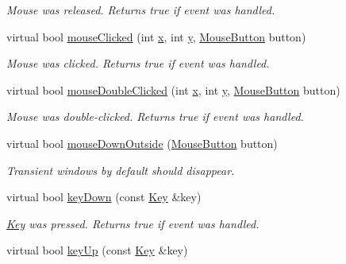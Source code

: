\begin{DoxyCompactItemize}
\begin{DoxyCompactList}\small\item\em Mouse was released. Returns true if event was handled. \end{DoxyCompactList}\item 
virtual bool \hyperlink{classGUI_1_1Window_a9519fe8a8f08b5b70524d2230d209107}{mouse\-Clicked} (int \hyperlink{classGUI_1_1Window_a6ca6a80ca00c9e1d8ceea8d3d99a657d}{x}, int \hyperlink{classGUI_1_1Window_a0ee8e923aff2c3661fc2e17656d37adf}{y}, \hyperlink{namespaceGUI_ad06082a7b02aa73697f39eb8e0856de9}{Mouse\-Button} button)
\begin{DoxyCompactList}\small\item\em Mouse was clicked. Returns true if event was handled. \end{DoxyCompactList}\item 
\hypertarget{classGUI_1_1Window_a42d1c5fd68792cc1bfe551c9fcf76248}{virtual bool \hyperlink{classGUI_1_1Window_a42d1c5fd68792cc1bfe551c9fcf76248}{mouse\-Double\-Clicked} (int \hyperlink{classGUI_1_1Window_a6ca6a80ca00c9e1d8ceea8d3d99a657d}{x}, int \hyperlink{classGUI_1_1Window_a0ee8e923aff2c3661fc2e17656d37adf}{y}, \hyperlink{namespaceGUI_ad06082a7b02aa73697f39eb8e0856de9}{Mouse\-Button} button)}\label{classGUI_1_1Window_a42d1c5fd68792cc1bfe551c9fcf76248}

\begin{DoxyCompactList}\small\item\em Mouse was double-\/clicked. Returns true if event was handled. \end{DoxyCompactList}\item 
virtual bool \hyperlink{classGUI_1_1Window_a7f661001795d601ecf3f4af66ac19e0f}{mouse\-Down\-Outside} (\hyperlink{namespaceGUI_ad06082a7b02aa73697f39eb8e0856de9}{Mouse\-Button} button)
\begin{DoxyCompactList}\small\item\em Transient windows by default should disappear. \end{DoxyCompactList}\item 
\hypertarget{classGUI_1_1Window_a9d058fb85cb7d5a616e292cc02e01959}{virtual bool \hyperlink{classGUI_1_1Window_a9d058fb85cb7d5a616e292cc02e01959}{key\-Down} (const \hyperlink{classGUI_1_1Key}{Key} \&key)}\label{classGUI_1_1Window_a9d058fb85cb7d5a616e292cc02e01959}

\begin{DoxyCompactList}\small\item\em \hyperlink{classGUI_1_1Key}{Key} was pressed. Returns true if event was handled. \end{DoxyCompactList}\item 
\hypertarget{classGUI_1_1Window_a038bb9134a90795205fdb604977a1520}{virtual bool \hyperlink{classGUI_1_1Window_a038bb9134a90795205fdb604977a1520}{key\-Up} (const \hyperlink{classGUI_1_1Key}{Key} \&key)}\label{classGUI_1_1Window_a038bb9134a90795205fdb604977a1520}


\end{DoxyCompactItemize}
